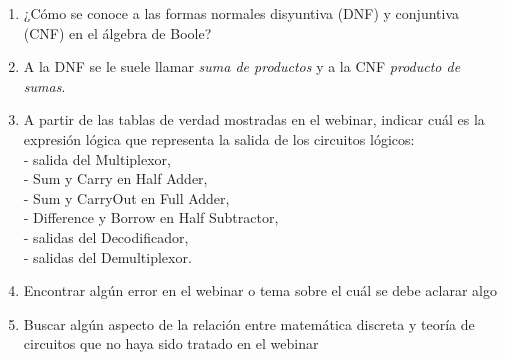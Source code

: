 \documentclass[a4paper]{article}
\newcommand{\answer}{\item[**]}
\begin{document}
\begin{enumerate}[resume]
\begin{enumerate} [label=(\alph*)]
		\item ¿Cómo se conoce a las formas normales disyuntiva (DNF) y conjuntiva (CNF) en el álgebra de Boole? 
		\answer A la DNF se le suele llamar \textit{suma de productos} y a la CNF \textit{producto de sumas}.

		\item A partir de las tablas de verdad mostradas en el webinar, indicar cuál es la expresión lógica que representa la salida de los circuitos lógicos: \\ - salida del Multiplexor,\\ - Sum y Carry en Half Adder,\\ - Sum y CarryOut en Full Adder,\\ - Difference y Borrow en Half Subtractor,\\ - salidas del Decodificador,\\ - salidas del Demultiplexor. 

		\item Encontrar algún error en el webinar o tema sobre el cuál se debe aclarar algo 

		\item Buscar algún aspecto de la relación entre matemática discreta y teoría de circuitos que no haya sido tratado en el webinar

	\end{enumerate}
	\fi

	

\end{enumerate}
\end{document}
